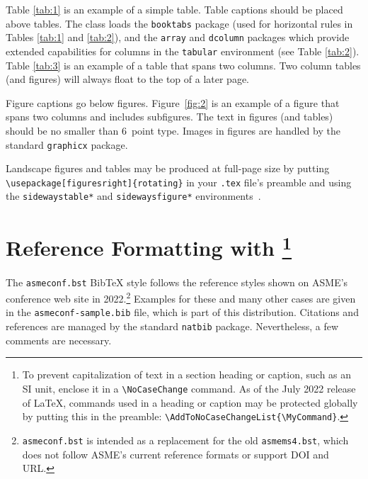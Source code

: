\documentclass[captionpatch,colorlinks,upint,subscriptcorrection,varvw,german]{asmeconf}
\begin{document}
Table \ref{tab:1} is an example of a simple table. Table captions should be placed above tables.
The class loads the \texttt{booktabs} package (used for horizontal rules in Tables \ref{tab:1} and \ref{tab:2}), and the \texttt{array} and \texttt{dcolumn} packages which provide extended capabilities for columns in the \texttt{tabular} environment (see Table \ref{tab:2}).  Table \ref{tab:3} is an example of a table that spans two columns. Two column tables (and figures) will always float to the top of a later page.

Figure captions go below figures. Figure~\ref{fig:2} is an example of a figure that spans two columns and includes subfigures. The text in figures (and tables) should be no smaller than 6~point type. Images in figures are handled by the standard \texttt{graphicx} package.

Landscape figures and tables may be produced at full-page size by putting \verb|\usepackage[figuresright]{rotating}| in your \texttt{.tex} file's preamble and using the \texttt{sidewaystable*} and \texttt{sidewaysfigure*} environments~\cite{fairbairns}.



\section{Reference Formatting with \footnote{To prevent capitalization of text in a section heading or caption, such as an SI unit, enclose it in a \texttt{\textbackslash NoCaseChange} command. As of the July 2022 release of \LaTeX, commands used in a heading or caption may be protected globally by putting this in the preamble: \texttt{\textbackslash AddToNoCaseChangeList\{\textbackslash MyCommand\}}.}}\label{sec:references}

The {\upshape\texttt{asmeconf.bst}} Bib\TeX{}  style follows the reference styles shown on ASME's conference web site in  2022.\footnote{\texttt{asmeconf.bst} is intended as a replacement for the old \texttt{asmems4.bst}, which does not follow ASME's current reference formats or support DOI and URL.}
Examples for these and many other cases are given in the \texttt{asmeconf-sample.bib} file, which is part of this distribution. Citations and references are managed by the standard \texttt{natbib} package.  Nevertheless, a few comments are necessary.

\end{document}
